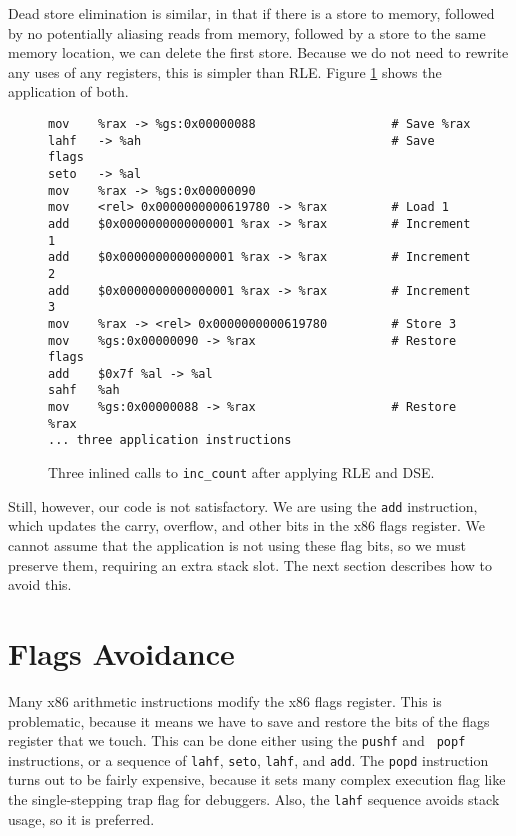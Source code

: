Dead store elimination is similar, in that if there is a store to memory,
followed by no potentially aliasing reads from memory, followed by a store to
the same memory location, we can delete the first store.  Because we do not need
to rewrite any uses of any registers, this is simpler than RLE.  Figure
\ref{fig:inscount_rle_dse} shows the application of both.

\begin{figure}
\begin{verbatim}
mov    %rax -> %gs:0x00000088                   # Save %rax
lahf   -> %ah                                   # Save flags
seto   -> %al 
mov    %rax -> %gs:0x00000090 
mov    <rel> 0x0000000000619780 -> %rax         # Load 1
add    $0x0000000000000001 %rax -> %rax         # Increment 1
add    $0x0000000000000001 %rax -> %rax         # Increment 2
add    $0x0000000000000001 %rax -> %rax         # Increment 3
mov    %rax -> <rel> 0x0000000000619780         # Store 3
mov    %gs:0x00000090 -> %rax                   # Restore flags
add    $0x7f %al -> %al 
sahf   %ah 
mov    %gs:0x00000088 -> %rax                   # Restore %rax
... three application instructions
\end{verbatim}
\caption{Three inlined calls to {\tt inc\_count} after applying RLE and DSE.}
\label{fig:inscount_rle_dse}
\end{figure}

Still, however, our code is not satisfactory.  We are using the {\tt add}
instruction, which updates the carry, overflow, and other bits in the x86 flags
register.  We cannot assume that the application is not using these flag bits,
so we must preserve them, requiring an extra stack slot.  The next section
describes how to avoid this.

\section{Flags Avoidance}

Many x86 arithmetic instructions modify the x86 flags register.  This is
problematic, because it means we have to save and restore the bits of the flags
register that we touch.  This can be done either using the {\tt pushf} and {\tt
popf} instructions, or a sequence of {\tt lahf}, {\tt seto}, {\tt lahf}, and
{\tt add}.  The {\tt popd} instruction turns out to be fairly expensive, because
it sets many complex execution flag like the single-stepping trap flag for
debuggers.  Also, the {\tt lahf} sequence avoids stack usage, so it is
preferred.

